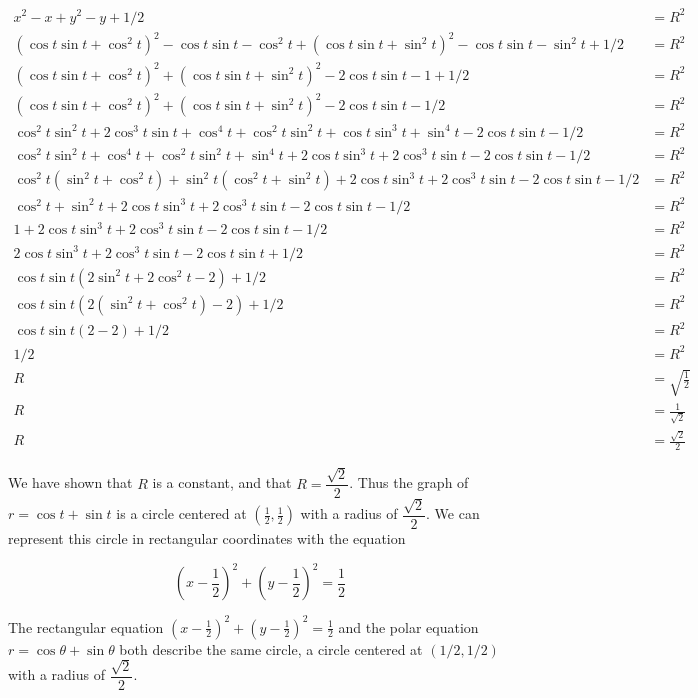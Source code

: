 \begin{align*}
x^2 - x + y^2 - y + 1/2 &= R^2 \\
(\cos t \sin t + \cos^2 t)^2 - \cos t \sin t - \cos^2 t + (\cos t \sin t + \sin^2 t)^2 - \cos t \sin t - \sin^2 t + 1/2 &= R^2 \\
(\cos t \sin t + \cos^2 t)^2 + (\cos t \sin t + \sin^2 t)^2 - 2\cos t \sin t - 1 + 1/2 &= R^2 \\
(\cos t \sin t + \cos^2 t)^2 + (\cos t \sin t + \sin^2 t)^2 - 2\cos t \sin t - 1/2 &= R^2 \\
\cos^2 t \sin^2 t + 2 \cos^3 t \sin t + \cos^4 t + \cos^2 t \sin^2 t + \cos t \sin^3 t + \sin^4 t - 2\cos t \sin t - 1/2 &= R^2 \\
\cos^2 t \sin^2 t + \cos^4 t + \cos^2 t \sin^2 t + \sin^4 t + 2\cos t \sin^3 t + 2 \cos^3 t \sin t - 2\cos t \sin t - 1/2 &= R^2 \\
\cos^2 t (\sin^2 t + \cos^2 t) + \sin^2 t(\cos^2 t + \sin^2 t) + 2\cos t \sin^3 t + 2 \cos^3 t \sin t - 2\cos t \sin t - 1/2 &= R^2 \\
\cos^2 t + \sin^2 t + 2\cos t \sin^3 t + 2 \cos^3 t \sin t - 2\cos t \sin t - 1/2 &= R^2 \\
1 + 2\cos t \sin^3 t + 2 \cos^3 t \sin t - 2\cos t \sin t - 1/2 &= R^2 \\
2\cos t \sin^3 t + 2 \cos^3 t \sin t - 2\cos t \sin t + 1/2 &= R^2 \\
\cos t \sin t (2\sin^2 t + 2 \cos^2 t - 2) + 1/2 &= R^2 \\
\cos t \sin t (2(\sin^2 t + \cos^2 t) - 2) + 1/2 &= R^2 \\
\cos t \sin t (2 - 2) + 1/2 &= R^2 \\
1/2 &= R^2 \\
R &= \sqrt{\frac{1}{2}} \\
R &= \frac{1}{\sqrt 2} \\
R &= \frac{\sqrt 2}{2}
\end{align*}

We have shown that $R$ is a constant, and that $R = \dfrac{\sqrt 2}{2}$. Thus the graph of $r = \cos t + \sin t$ is a circle centered at $\displaystyle \left(\frac{1}{2}, \frac{1}{2}\right)$ with a radius of $\dfrac{\sqrt 2}{2}$. We can represent this circle in rectangular coordinates with the equation

$$ \left(x - \frac{1}{2}\right)^2 + \left(y - \frac{1}{2}\right)^2 = \frac{1}{2} $$

The rectangular equation $\displaystyle \left(x - \frac{1}{2}\right)^2 + \left(y - \frac{1}{2}\right)^2 = \frac{1}{2}$ and the polar equation $r = \cos \theta + \sin \theta$ both describe the same circle, a circle centered at $(1/2, 1/2)$ with a radius of $\dfrac{\sqrt 2}{2}$.
